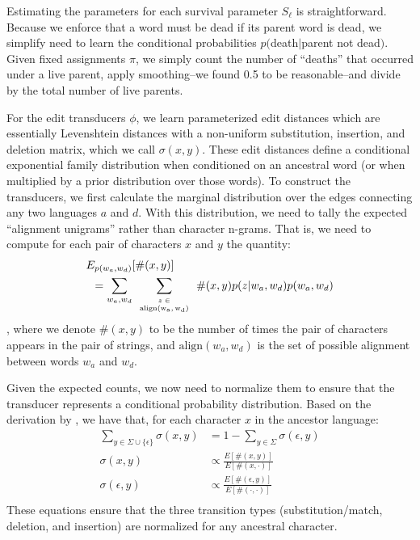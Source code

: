 \documentclass[11pt,a4paper]{article}
\begin{document}
Estimating the parameters for each survival parameter $S_\ell$ is
straightforward. Because we enforce that a word must be dead if its
parent word is dead, we simplify need to learn the conditional
probabilities $p($death$|$parent not dead$)$. Given fixed assignments
$\pi$, we simply count the number of ``deaths'' that occurred under
a live parent, apply smoothing--we found 0.5 to be reasonable--and
divide by the total number of live parents.

For the edit transducers $\phi$, we learn parameterized edit distances
which are essentially Levenshtein distances with a non-uniform
substitution, insertion, and deletion matrix, which we call
$\sigma(x,y)$. These edit distances define a conditional exponential
family distribution when conditioned on an ancestral word (or when
multiplied by a prior distribution over those words).  To construct
the transducers, we first calculate the marginal distribution over
the edges connecting any two languages $a$ and $d$. With this
distribution, we need to tally the expected ``alignment unigrams''
rather than character n-grams. That is, we need to compute for each
pair of characters $x$ and $y$ the quantity:
\begin{equation}
  \begin{split}
    E_{p(w_a,w_d)}&[\#(x,y)] \\ = \sum_{w_a,w_d} &\sum_{\tiny\begin{array}{c} z\in \\ \mathrm{align(w_a,w_d)} \end{array}} \#(x,y) p(z|w_a,w_d)p(w_a,w_d)
   \end{split}
 \end{equation}
, where we denote $\#(x,y)$ to be the number of times the pair of characters
appears in the pair of strings, and $\mathrm{align}(w_a,w_d)$ is the set of possible
alignment between words $w_a$ and $w_d$.


Given the expected counts, we now need to normalize them to ensure that the transducer represents a conditional
probability distribution. Based on the derivation by 
, we have that, for each character $x$ in the ancestor language:
\begin{equation}
  \begin{split}
    \sum_{y \in \Sigma \cup \{\epsilon\}} \sigma(x,y) &= 1 - \sum_{y \in \Sigma} \sigma(\epsilon,y) \\
    \sigma(x,y) &\propto \frac{E[\#(x,y)]}{E[\#(x,\cdot)]} \\
    \sigma(\epsilon,y) &\propto \frac{E[\#(\epsilon,y)]}{E[\#(\cdot,\cdot)]} \\
   \end{split}
 \end{equation}
These equations ensure that the three transition
types (substitution/match, deletion, and insertion) are normalized for
any ancestral character.
\end{document}
